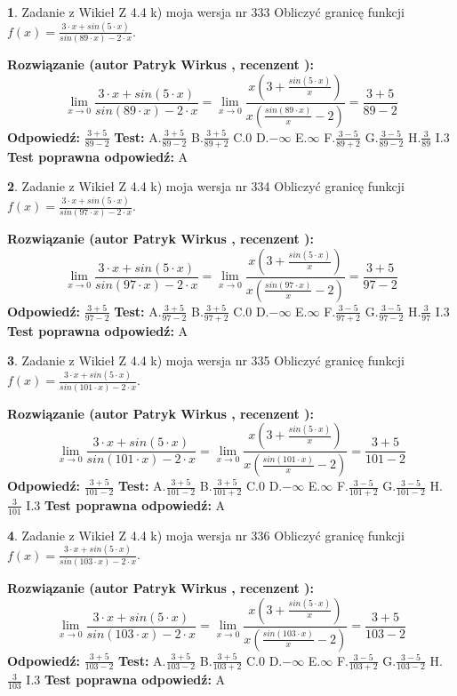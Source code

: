 \documentclass[12pt, a4paper]{article}
\theoremstyle{definition} %
\newtheorem{zad}{}
\newcommand{\zadStart}[1]{\begin{zad}#1\newline}
\newcommand{\zadStop}{\end{zad}}
\newcommand{\rozwStart}[2]{\noindent \textbf{Rozwiązanie (autor #1 , recenzent #2): }\newline}
\newcommand{\rozwStop}{\newline}
\newcommand{\odpStart}{\noindent \textbf{Odpowiedź:}\newline}
\newcommand{\odpStop}{\newline}
\newcommand{\testStart}{\noindent \textbf{Test:}\newline}
\newcommand{\testStop}{\newline}
\newcommand{\kluczStart}{\noindent \textbf{Test poprawna odpowiedź:}\newline}
\newcommand{\kluczStop}{\newline}
\begin{document}
\zadStart{Zadanie z Wikieł Z 4.4 k) moja wersja nr 333}
Obliczyć granicę funkcji $f(x)=\frac{3\cdot x +sin(5\cdot x)}{sin(89\cdot x) -2\cdot x}$.
\zadStop
\rozwStart{Patryk Wirkus}{}
$$\lim\limits_{x\to 0}\frac{3\cdot x +sin(5\cdot x)}{sin(89\cdot x) -2\cdot x}
=\lim\limits_{x\to 0}\frac{x(3+\frac{sin(5\cdot x)}{x})}{x(\frac{sin(89\cdot x)}{x}-2)}
=\frac{3+5}{89-2}$$
\rozwStop
\odpStart
$\frac{3+5}{89-2}$
\odpStop
\testStart
A.$\frac{3+5}{89-2}$
B.$\frac{3+5}{89+2}$
C.$0$
D.$-\infty$
E.$\infty$
F.$\frac{3-5}{89+2}$
G.$\frac{3-5}{89-2}$
H.$\frac{3}{89}$
I.$3$
\testStop
\kluczStart
A
\kluczStop



\zadStart{Zadanie z Wikieł Z 4.4 k) moja wersja nr 334}
Obliczyć granicę funkcji $f(x)=\frac{3\cdot x +sin(5\cdot x)}{sin(97\cdot x) -2\cdot x}$.
\zadStop
\rozwStart{Patryk Wirkus}{}
$$\lim\limits_{x\to 0}\frac{3\cdot x +sin(5\cdot x)}{sin(97\cdot x) -2\cdot x}
=\lim\limits_{x\to 0}\frac{x(3+\frac{sin(5\cdot x)}{x})}{x(\frac{sin(97\cdot x)}{x}-2)}
=\frac{3+5}{97-2}$$
\rozwStop
\odpStart
$\frac{3+5}{97-2}$
\odpStop
\testStart
A.$\frac{3+5}{97-2}$
B.$\frac{3+5}{97+2}$
C.$0$
D.$-\infty$
E.$\infty$
F.$\frac{3-5}{97+2}$
G.$\frac{3-5}{97-2}$
H.$\frac{3}{97}$
I.$3$
\testStop
\kluczStart
A
\kluczStop



\zadStart{Zadanie z Wikieł Z 4.4 k) moja wersja nr 335}
Obliczyć granicę funkcji $f(x)=\frac{3\cdot x +sin(5\cdot x)}{sin(101\cdot x) -2\cdot x}$.
\zadStop
\rozwStart{Patryk Wirkus}{}
$$\lim\limits_{x\to 0}\frac{3\cdot x +sin(5\cdot x)}{sin(101\cdot x) -2\cdot x}
=\lim\limits_{x\to 0}\frac{x(3+\frac{sin(5\cdot x)}{x})}{x(\frac{sin(101\cdot x)}{x}-2)}
=\frac{3+5}{101-2}$$
\rozwStop
\odpStart
$\frac{3+5}{101-2}$
\odpStop
\testStart
A.$\frac{3+5}{101-2}$
B.$\frac{3+5}{101+2}$
C.$0$
D.$-\infty$
E.$\infty$
F.$\frac{3-5}{101+2}$
G.$\frac{3-5}{101-2}$
H.$\frac{3}{101}$
I.$3$
\testStop
\kluczStart
A
\kluczStop



\zadStart{Zadanie z Wikieł Z 4.4 k) moja wersja nr 336}
Obliczyć granicę funkcji $f(x)=\frac{3\cdot x +sin(5\cdot x)}{sin(103\cdot x) -2\cdot x}$.
\zadStop
\rozwStart{Patryk Wirkus}{}
$$\lim\limits_{x\to 0}\frac{3\cdot x +sin(5\cdot x)}{sin(103\cdot x) -2\cdot x}
=\lim\limits_{x\to 0}\frac{x(3+\frac{sin(5\cdot x)}{x})}{x(\frac{sin(103\cdot x)}{x}-2)}
=\frac{3+5}{103-2}$$
\rozwStop
\odpStart
$\frac{3+5}{103-2}$
\odpStop
\testStart
A.$\frac{3+5}{103-2}$
B.$\frac{3+5}{103+2}$
C.$0$
D.$-\infty$
E.$\infty$
F.$\frac{3-5}{103+2}$
G.$\frac{3-5}{103-2}$
H.$\frac{3}{103}$
I.$3$
\testStop
\kluczStart
A
\kluczStop
\end{document}

